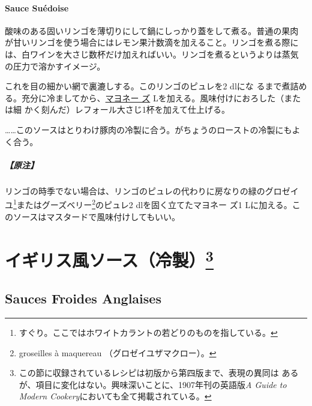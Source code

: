 \begin{recette}
\hypertarget{sauce-suuxe9doise}{%
\paragraph{Sauce Suédoise}\label{sauce-suuxe9doise}}


酸味のある固いリンゴを薄切りにして鍋にしっかり蓋をして煮る。普通の果肉
が甘いリンゴを使う場合にはレモン果汁数滴を加えること。リンゴを煮る際に
は、白ワインを大さじ数杯だけ加えればいい。リンゴを煮るというよりは蒸気
の圧力で溶かすイメージ。

これを目の細かい網で裏漉しする。このリンゴのピュレを2\undemi{} dlにな
るまで煮詰める。充分に冷ましてから、\protect\hyperlink{mayonnaise}{マヨネー
ズ}\troisquarts{} Lを加える。風味付けにおろした（または細
かく刻んだ）レフォール大さじ1\undemi{}杯を加えて仕上げる。

\ldots{}\ldots{}このソースはとりわけ豚肉の冷製に合う。がちょうのローストの冷製にもよく合う。

\hypertarget{ux539fux6ce8-5}{%
\subparagraph{【原注】}\label{ux539fux6ce8-5}}

リンゴの時季でない場合は、リンゴのピュレの代わりに房なりの緑のグロゼイ
ユ\footnote{すぐり。ここではホワイトカラントの若どりのものを指している。}またはグーズベリー\footnote{groseilles
  à maquereau （グロゼイユザマクロー）。}のピュレ2\undemi{}
dlを固く立てたマヨネー ズ1
Lに加える。このソースはマスタードで風味付けしてもいい。
\end{recette}
\hypertarget{ux30a4ux30aeux30eaux30b9ux98a8ux30bdux30fcux30b9ux51b7ux88fd57}{%
\section[イギリス風ソース（冷製）]{\texorpdfstring{イギリス風ソース（冷製）\footnote{この節に収録されているレシピは初版から第四版まで、表現の異同は
  あるが、項目に変化はない。興味深いことに、1907年刊の英語版\emph{A
  Guide to Modern Cookery}においても全て掲載されている。}}{イギリス風ソース（冷製）}}\label{ux30a4ux30aeux30eaux30b9ux98a8ux30bdux30fcux30b9ux51b7ux88fd57}}

\hypertarget{sauces-froides-anglaises}{%
\subsection{Sauces Froides Anglaises}\label{sauces-froides-anglaises}}

